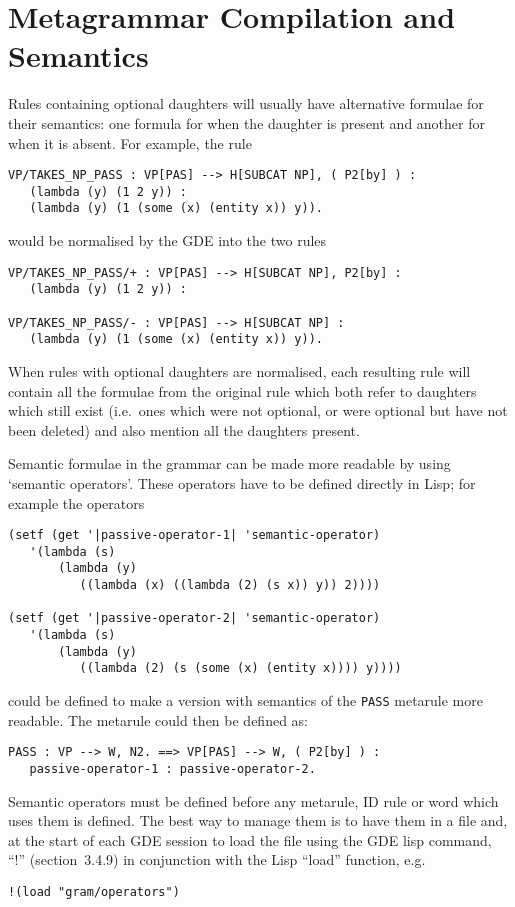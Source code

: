 \section{Metagrammar Compilation and Semantics}

Rules containing optional daughters will usually have alternative formulae
for their semantics: one formula for when the daughter is present and
another for when it is absent. For example, the rule
\begin{ex}
\begin{verbatim}
VP/TAKES_NP_PASS : VP[PAS] --> H[SUBCAT NP], ( P2[by] ) :
   (lambda (y) (1 2 y)) :
   (lambda (y) (1 (some (x) (entity x)) y)).
\end{verbatim}
\end{ex}
would be normalised by the GDE into the two rules
\begin{ex}
\begin{verbatim}
VP/TAKES_NP_PASS/+ : VP[PAS] --> H[SUBCAT NP], P2[by] :
   (lambda (y) (1 2 y)) :

VP/TAKES_NP_PASS/- : VP[PAS] --> H[SUBCAT NP] :
   (lambda (y) (1 (some (x) (entity x)) y)).
\end{verbatim}
\end{ex}
When rules with optional daughters are normalised, each
resulting rule will contain all the formulae from the original
rule which both refer to daughters which still exist (i.e.\ ones which
were not optional, or were optional but have not been deleted) and also
mention all the daughters present.

Semantic formulae in the grammar can be made more readable by using
`semantic operators'. These operators have to be defined directly
in Lisp; for example the operators
\begin{ex}
\begin{verbatim}
(setf (get '|passive-operator-1| 'semantic-operator)
   '(lambda (s)
       (lambda (y)
          ((lambda (x) ((lambda (2) (s x)) y)) 2))))

(setf (get '|passive-operator-2| 'semantic-operator)
   '(lambda (s)
       (lambda (y)
          ((lambda (2) (s (some (x) (entity x)))) y))))
\end{verbatim}
\end{ex}
could be defined to make a version with semantics of the {\tt PASS}
metarule more readable. The metarule could then be defined as:
\begin{ex}
\begin{verbatim}
PASS : VP --> W, N2. ==> VP[PAS] --> W, ( P2[by] ) :
   passive-operator-1 : passive-operator-2.
\end{verbatim}
\end{ex}
Semantic operators must be defined before any metarule, ID rule or
word which uses them is defined. The best way to manage them is
to have them in a file and, at the start of each GDE session to load the
file using the GDE lisp command, ``!'' (section~3.4.9) in conjunction
with the Lisp ``load'' function, e.g.
\begin{ex}
\begin{verbatim}
!(load "gram/operators")
\end{verbatim}
\end{ex}


